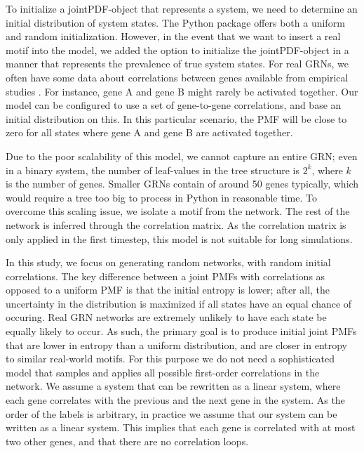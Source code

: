 \documentclass[../main.tex]{subfiles}
\begin{document}
To initialize a jointPDF-object that represents a system, we need to determine an initial distribution of system states.
The Python package offers both a uniform and random initialization.
However, in the event that we want to insert a real motif into the model, we added the option to initialize the jointPDF-object in a manner that represents the prevalence of true system states.
For real GRNs, we often have some data about correlations between genes available from empirical studies \cite{ideker2001integrated}.
For instance, gene A and gene B might rarely be activated together.
Our model can be configured to use a set of gene-to-gene correlations, and base an initial distribution on this.
In this particular scenario, the PMF will be close to zero for all states where gene A and gene B are activated together.

Due to the poor scalability of this model, we cannot capture an entire GRN; even in a binary system, the number of leaf-values in the tree structure is $2^k$, where $k$ is the number of genes.
Smaller GRNs contain of around 50 genes typically, which would require a tree too big to process in Python in reasonable time.
To overcome this scaling issue, we isolate a motif from the network.
The rest of the network is inferred through the correlation matrix.
As the correlation matrix is only applied in the first timestep, this model is not suitable for long simulations.

In this study, we focus on generating random networks, with random initial correlations.
The key difference between a joint PMFs with correlations as opposed to a uniform PMF is that the initial entropy is lower; after all, the uncertainty in the distribution is maximized if all states have an equal chance of occuring.
Real GRN networks are extremely unlikely to have each state be equally likely to occur.
As such, the primary goal is to produce initial joint PMFs that are lower in entropy than a uniform distribution, and are closer in entropy to similar real-world motifs. 
For this purpose we do not need a sophisticated model that samples and applies all possible first-order correlations in the network.
We assume a system that can be rewritten as a linear system, where each gene correlates with the previous and the next gene in the system.
As the order of the labels is arbitrary, in practice we assume that our system can be written as a linear system.
This implies that each gene is correlated with at most two other genes, and that there are no correlation loops.
\end{document}
